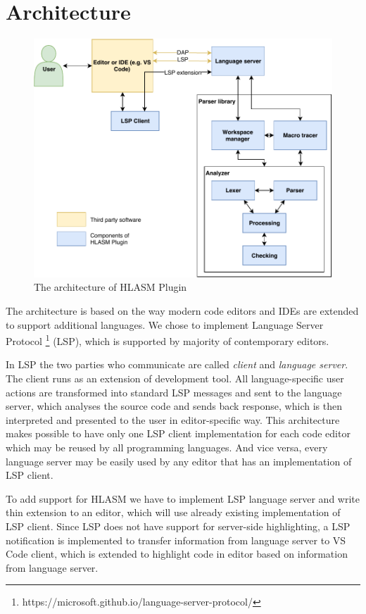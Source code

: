 \chapter{Architecture}

\begin{figure}
	\centering
	\includegraphics[width=\textwidth]{img/hlasm_architecture}
	\caption{The architecture of HLASM Plugin}
	\label{fig03:arch}
\end{figure}

 The architecture is based on the way modern code editors and IDEs are extended to support additional languages. We chose to implement Language Server Protocol \footnote{https://microsoft.github.io/language-server-protocol/} (LSP), which is supported by majority of contemporary editors.

In LSP the two parties who communicate are called \emph{client}  and \emph{language server}. The client runs as an extension of development tool. All language-specific user actions are transformed into standard LSP messages and sent to the language server, which analyses the source code and sends back response, which is then interpreted and presented to the user in editor-specific way. This architecture makes possible to have only one LSP client implementation for each code editor which may be reused by all programming languages. And vice versa, every language server may be easily used by any editor that has an implementation of LSP client.

To add support for HLASM we have to implement LSP language server and write thin extension to an editor, which will use already existing implementation of LSP client. Since LSP does not have support for server-side highlighting, a LSP notification is implemented to transfer information from language server to VS Code client, which is extended to highlight code in editor based on information from language server.

